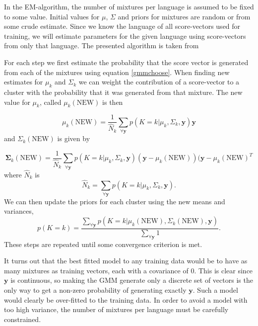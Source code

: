 In the EM-algorithm, the number of mixtures per language is assumed to be fixed to some value. Initial values for $\mu$, $\Sigma$ and priors for mixtures are random or from some crude estimate. Since we know the language of all score-vectors used for training, we will estimate parameters for the given language using score-vectors from only that language. The presented algorithm is taken from \cite[o. 439]{machinelearningbook}

For each step we first estimate the probability that the score vector is generated from each of the mixtures using equation \ref{gmmchoose}. When finding new estimates for $\mu_k$ and $\Sigma_k$ we can weight the contribution of a score-vector to a cluster with the probability that it was generated from that mixture. The new value for $\mu_k$, called $\mu_k(\text{NEW})$ is then

\begin{equation}
\label{emmuest}
\mu_k(\text{NEW}) = \frac{1}{\hat{N}_k}\sum_{\forall \mathbf{y}} p(K=k | \mu_k, \Sigma_k, \mathbf{y})\mathbf{y}
\end{equation}
and $\Sigma_k(\text{NEW})$ is given by

\begin{equation}
\label{emsigmaest}
\mathbf{\Sigma}_k(\text{NEW}) = \frac{1}{\hat{N}_k}\sum_{\forall \mathbf{y}} p(K=k | \mu_k, \Sigma_k, \mathbf{y})(\mathbf{y}-\mu_k(\text{NEW}))(\mathbf{y}-\mu_k(\text{NEW})^T
\end{equation}
where $\hat{N}_k$ is 
\begin{equation}
\label{emnkest}
\hat{N}_k = \sum_{\forall \mathbf{y}} p(K=k | \mu_k, \Sigma_k, \mathbf{y}).
\end{equation}
We can then update the priors for each cluster using the new means and variances,
\begin{equation}
\label{empriorest}
p(K=k) = \frac{\sum_{\forall \mathbf{y}}p(K=k | \mu_k(\text{NEW}), \Sigma_k(\text{NEW}), \mathbf{y})}{\sum_{\forall \mathbf{y}} 1}.
\end{equation}
These steps are repeated until some convergence criterion is met.

It turns out that the best fitted model to any training data would be to have as many mixtures as training vectors, each with a covariance of 0. This is clear since $\mathbf{y}$ is continuous, so making the GMM generate only a discrete set of vectors is the only way to get a non-zero probability of generating exactly $\mathbf{y}$. Such a model would clearly be over-fitted to the training data. In order to avoid a model with too high variance, the number of mixtures per language must be carefully constrained.

